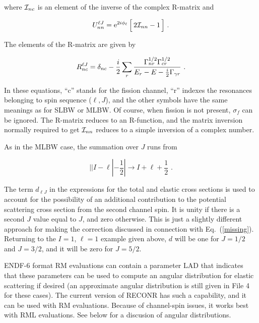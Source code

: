 \noindent where ${\cal I}_{nc}$ is an element of the inverse of the
complex R-matrix and

\begin{equation}
  U_{nn}^{\ell J}={\rm e}^{2i\phi_\ell}\,
    \Bigl[ \,2{\cal I}_{nn}-1\, \Bigr] \,\,.
\label{ufun}
\end{equation}

\noindent The elements of the R-matrix are given by

\begin{equation}
  R_{nc}^{\ell J}=\delta_{nc}
    -{\frac{i}{2}}\sum_r {{\Gamma_{nr}^{1/2}\Gamma_{cr}^{1/2}}
    \over{E_r-E-{\frac{i}{2}}\Gamma_{\gamma r}}}\,\,.
\end{equation}
\vspace{0.5 pt}

\noindent In these equations, ``c'' stands for the fission channel, ``r''
indexes the resonances belonging to spin sequence ($\ell,J$), and
the other symbols have the same meanings as for SLBW or MLBW.  Of
course, when fission is not present, $\sigma_f$ can be ignored.
The R-matrix reduces to an R-function, and
the matrix inversion normally required to get ${\cal I}_{nn}$
reduces to a simple inversion of a complex number.

As in the MLBW case, the
summation over $J$ runs from

\begin{equation}
   ||I-\ell|-\frac{1}{2}| \rightarrow I+\ell+\frac{1}{2} \,\,.
\end{equation}

\noindent The term $d_{\ell J}$ in the expressions for the total and
elastic cross sections is used to account for the possibility
of an additional contribution to the potential scattering
cross section from the second channel spin.  It is unity
if there is a second $J$ value equal to $J$, and zero otherwise.
This is just a slightly different approach for making the
correction discussed in connection with Eq.~(\ref{missing}).
Returning to the $I{=}1$, $\ell{=}1$ example given above,
$d$ will be one for $J{=}1/2$ and $J{=}3/2$, and it will
be zero for $J{=}5/2$.

ENDF-6 format RM evaluations can contain a parameter
LAD that indicates that these parameters can be used to compute an
angular distribution
for elastic scattering if desired (an approximate angular
distribution is still given in File 4 for these cases).  The
current version of RECONR has such a capability, and it can
be used with RM evaluations.  Because of channel-spin
issues, it works best with RML evaluations.
See below for a discusion of angular distributions.

